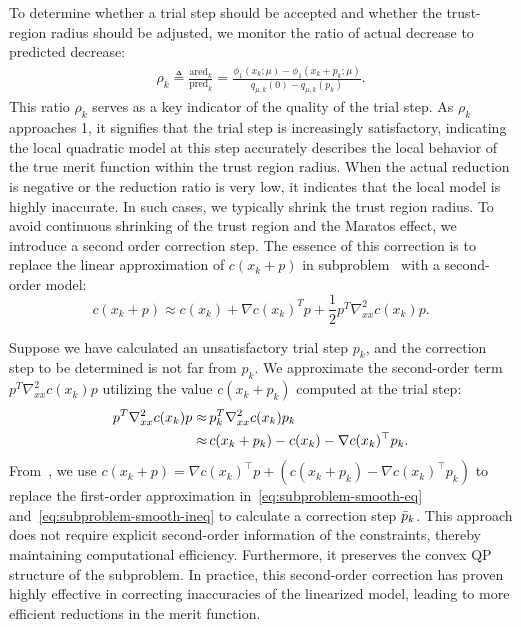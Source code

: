 To determine whether a trial step should be accepted and whether the trust-region radius should be adjusted, we monitor the ratio of actual decrease to predicted decrease:
\begin{align}
    \label{eq:reduction_ratio}
    \rho_k \triangleq \frac{\text{ared}_k}{\text{pred}_k} 
    = \frac{
        \phi_1(x_k; \mu) - \phi_1(x_k + p_k; \mu)
    }{
        q_{\mu,k}(0) - q_{\mu,k}(p_k) 
    }.
\end{align}
This ratio $\rho_k$ serves as a key indicator of the quality of the trial step. As $\rho_k$ approaches 1, it signifies that the trial step is increasingly satisfactory, indicating the local quadratic model at this step accurately describes the local behavior of the true merit function within the trust region radius. When the actual reduction is negative or the reduction ratio is very low, it indicates that the local model is highly inaccurate. In such cases, we typically shrink the trust region radius. To avoid continuous shrinking of the trust region and the Maratos effect, we introduce a second order correction step. The essence of this correction is to replace the linear approximation of $c(x_k+p)$ in subproblem~ with a second-order model:
\begin{equation}
c(x_k+p) \approx c(x_k) + \nabla c(x_k)^T p + \frac{1}{2}p^T \nabla_{xx}^2c(x_k) p.
\end{equation}

Suppose we have calculated an unsatisfactory trial step $p_k$, and the correction step to be determined is not far from $p_k$. 
We approximate the second-order term $p^T \nabla_{xx}^2c(x_k) p$ utilizing the value $c(x_k + p_k)$ computed at the trial step:
\begin{align}\label{eq:second_order_correction}
    p^T \nabla_{xx}^2c(x_k) p \approx \,& p_k^T \nabla_{xx}^2c(x_k) p_k \notag\\ 
    \approx \,& c(x_k+p_k) - c(x_k) - \nabla c(x_k)^\top p_k.
\end{align}
From~, we use $c(x_k+p) = \nabla c(x_k)^{\top} p + (c(x_k+p_k) -  \nabla c(x_k)^\top p_k)$ to replace the first-order approximation in~\eqref{eq:subproblem-smooth-eq} and~\eqref{eq:subproblem-smooth-ineq} to calculate a correction step $\Bar{p}_k$.
This approach does not require explicit second-order information of the constraints, thereby maintaining computational efficiency. Furthermore, it preserves the convex QP structure of the subproblem. In practice, this second-order correction has proven highly effective in correcting inaccuracies of the linearized model, leading to more efficient reductions in the merit function.

